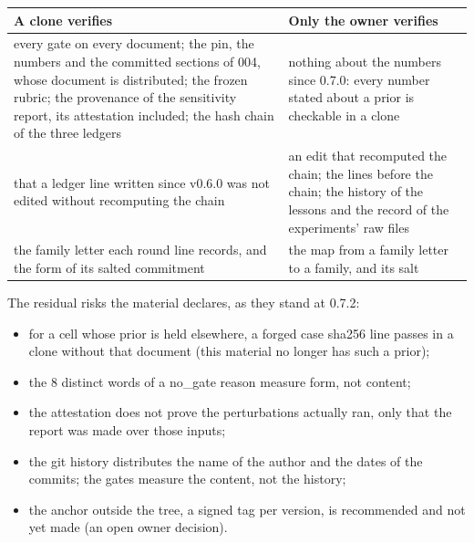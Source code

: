 \documentclass[
  american,
  10pt,
]{report}
\newcounter{none} %
\providecommand{\tightlist}{%
  \setlength{\itemsep}{0pt}\setlength{\parskip}{0pt}}
\renewcommand{\texttt}[1]{{\ttfamily\hyphenchar\font=-1 #1}}
\begin{document}
{\def\LTcaptype{none} %
\begin{longtable}[]{@{}
  >{\raggedright\arraybackslash}p{}
  >{\raggedright\arraybackslash}p{}@{}}
\toprule\noalign{}
\begin{minipage}[b]{\linewidth}\raggedright
A clone verifies
\end{minipage} & \begin{minipage}[b]{\linewidth}\raggedright
Only the owner verifies
\end{minipage} \\
\midrule\noalign{}
\endhead
\bottomrule\noalign{}
\endlastfoot
every gate on every document; the pin, the numbers and the committed
sections of \texttt{004}, whose document is distributed; the frozen
rubric; the provenance of the sensitivity report, its attestation
included; the hash chain of the three ledgers & nothing about the
numbers since 0.7.0: every number stated about a prior is checkable in a
clone \\
that a ledger line written since v0.6.0 was not edited without
recomputing the chain & an edit that recomputed the chain; the lines
before the chain; the history of the lessons and the record of the
experiments' raw files \\
the family letter each round line records, and the form of its salted
commitment & the map from a family letter to a family, and its salt \\
\end{longtable}
}

The residual risks the material declares, as they stand at 0.7.2:

\begin{itemize}
\tightlist
\item
  for a cell whose prior is held elsewhere, a forged
  \texttt{case sha256} line passes in a clone without that document
  (this material no longer has such a prior);
\item
  the 8 distinct words of a \texttt{no\_\allowbreak{}gate} reason
  measure form, not content;
\item
  the attestation does not prove the perturbations actually ran, only
  that the report was made over those inputs;
\item
  the git history distributes the name of the author and the dates of
  the commits; the gates measure the content, not the history;
\item
  the anchor outside the tree, a signed tag per version, is recommended
  and not yet made (an open owner decision).
\end{itemize}
\end{document}

